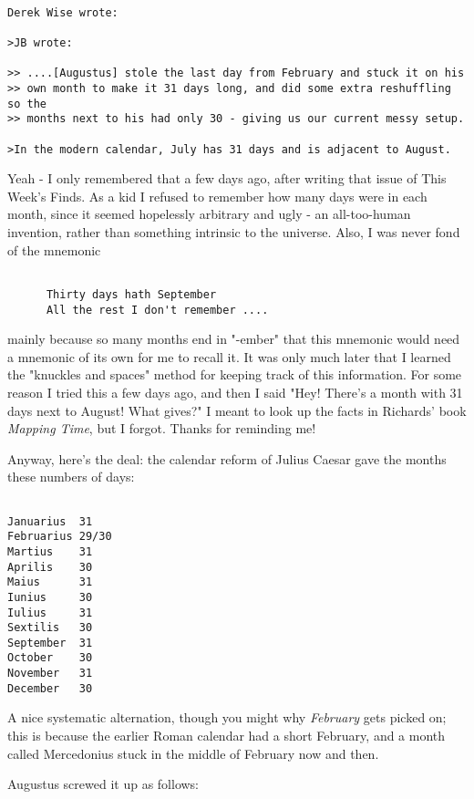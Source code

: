 \begin{verbatim}

Derek Wise wrote: 

>JB wrote:

>> ....[Augustus] stole the last day from February and stuck it on his
>> own month to make it 31 days long, and did some extra reshuffling so the
>> months next to his had only 30 - giving us our current messy setup.

>In the modern calendar, July has 31 days and is adjacent to August.
\end{verbatim}
    

Yeah - I only remembered that a few days ago, after writing that
issue of This Week's Finds.  As a kid I refused to remember how
many days were in each month, since it seemed hopelessly arbitrary
and ugly - an all-too-human invention, rather than something 
intrinsic to the universe.  Also, I was never fond of the mnemonic

\begin{verbatim}

      Thirty days hath September
      All the rest I don't remember ....
\end{verbatim}
    
mainly because so many months end in "-ember" that this mnemonic
would need a mnemonic of its own for me to recall it.  It was only
much later that I learned the "knuckles and spaces" method for
keeping track of this information.  For some reason I tried this
a few days ago, and then I said "Hey!  There's a month with 31 days 
next to August!  What gives?"  I meant to look up the facts in 
Richards' book \emph{Mapping Time}, but I forgot.  Thanks for reminding
me!

Anyway, here's the deal: the calendar reform of Julius Caesar
gave the months these numbers of days:


\begin{verbatim}

Januarius  31
Februarius 29/30
Martius    31
Aprilis    30
Maius      31
Iunius     30
Iulius     31
Sextilis   30
September  31
October    30
November   31
December   30
\end{verbatim}
    
A nice systematic alternation, though you might why \emph{February} gets
picked on; this is because the earlier Roman calendar had a short
February, and a month called Mercedonius stuck in the middle of
February now and then. 

Augustus screwed it up as follows:


